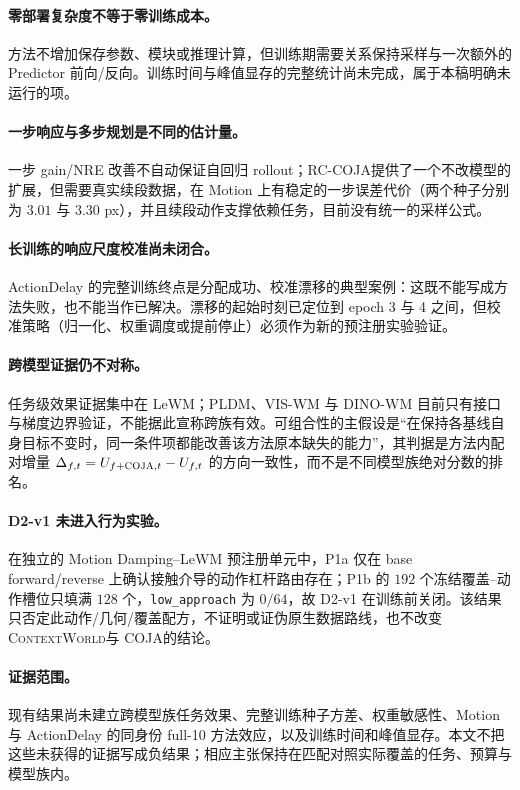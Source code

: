 \documentclass[UTF8,zihao=-4,fontset=fandol]{ctexart}
\newcommand{\method}{\textsc{COJA}}
\newcommand{\rcmethod}{\textsc{RC-COJA}}
\newcommand{\benchmark}{\textsc{ContextWorld}}
\begin{document}
\paragraph{零部署复杂度不等于零训练成本。}
方法不增加保存参数、模块或推理计算，但训练期需要关系保持采样与一次额外的 Predictor 前向/反向。训练时间与峰值显存的完整统计尚未完成，属于本稿明确未运行的项。

\paragraph{一步响应与多步规划是不同的估计量。}
一步 gain/NRE 改善不自动保证自回归 rollout；\rcmethod 提供了一个不改模型的扩展，但需要真实续段数据，在 Motion 上有稳定的一步误差代价（两个种子分别为 $3.01$ 与 $3.30$ px），并且续段动作支撑依赖任务，目前没有统一的采样公式。

\paragraph{长训练的响应尺度校准尚未闭合。}
ActionDelay 的完整训练终点是分配成功、校准漂移的典型案例：这既不能写成方法失败，也不能当作已解决。漂移的起始时刻已定位到 epoch 3 与 4 之间，但校准策略（归一化、权重调度或提前停止）必须作为新的预注册实验验证。

\paragraph{跨模型证据仍不对称。}
任务级效果证据集中在 LeWM；PLDM、VIS-WM 与 DINO-WM 目前只有接口与梯度边界验证，不能据此宣称跨族有效。可组合性的主假设是“在保持各基线自身目标不变时，同一条件项都能改善该方法原本缺失的能力”，其判据是方法内配对增量 $\Delta_{f,t}=U_{f+\method,t}-U_{f,t}$ 的方向一致性，而不是不同模型族绝对分数的排名。

\paragraph{D2-v1 未进入行为实验。}
在独立的 Motion Damping--LeWM 预注册单元中，P1a 仅在 base forward/reverse 上确认接触介导的动作杠杆路由存在；P1b 的 $192$ 个冻结覆盖--动作槽位只填满 $128$ 个，\texttt{low\_approach} 为 $0/64$，故 D2-v1 在训练前关闭。该结果只否定此动作/几何/覆盖配方，不证明或证伪原生数据路线，也不改变 \benchmark 与 \method 的结论。

\paragraph{证据范围。}
现有结果尚未建立跨模型族任务效果、完整训练种子方差、权重敏感性、Motion 与 ActionDelay 的同身份 full-10 方法效应，以及训练时间和峰值显存。本文不把这些未获得的证据写成负结果；相应主张保持在匹配对照实际覆盖的任务、预算与模型族内。
\end{document}
